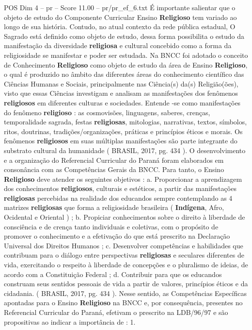 \begin{textsample}{POS Dim 4 – pr – Score 11.00 – pr/pr\_ef\_6.txt}
É importante salientar que o objeto de estudo do Componente Curricular Ensino \textbf{Religioso} tem variado ao longo de sua história.
Contudo, no atual contexto da rede pública estadual, O Sagrado está definido como objeto de estudo, dessa forma possibilita o estudo da manifestação da diversidade \textbf{religiosa} e cultural concebido como a forma da religiosidade se manifestar e poder ser estudada.
Na BNCC foi adotado o conceito de Conhecimento \textbf{Religioso} como objeto de estudo da área de Ensino \textbf{Religioso}, o qual é produzido no âmbito das diferentes áreas do conhecimento científico das Ciências Humanas e Sociais, principalmente nas Ciência(s) da(s) Religião(ões), visto que essas Ciências investigam e analisam as manifestações dos fenômenos \textbf{religiosos} em diferentes culturas e sociedades.
Entende -se como manifestações do fenômeno \textbf{religioso} : as cosmovisões, linguagens, saberes, crenças, temporalidade sagrada, festas \textbf{religiosas}, mitologias, narrativas, textos, símbolos, ritos, doutrinas, tradições/organizações, práticas e princípios éticos e morais.
Os fenômenos \textbf{religiosos} em suas múltiplas manifestações são parte integrante do substrato cultural da humanidade ( BRASIL, 2017, pg. 434 ).
O desenvolvimento e a organização do Referencial Curricular do Paraná foram elaborados em consonância com as Competências Gerais da BNCC.
Para tanto, o Ensino \textbf{Religioso} deve atender os seguintes objetivos : a.
Proporcionar a aprendizagem dos conhecimentos \textbf{religiosos}, culturais e estéticos, a partir das manifestações \textbf{religiosas} percebidas na realidade dos educandos sempre contemplando as 4 matrizes \textbf{religiosas} que forma a religiosidade brasileira ( \textbf{Indígena}, Afro, Ocidental e Oriental ) ; b.
Propiciar conhecimentos sobre o direito à liberdade de consciência e de crença tanto individuais e coletivas, com o propósito de promover o conhecimento e a efetivação do que está prescrito na Declaração Universal dos Direitos Humanos ; c.
Desenvolver competências e habilidades que contribuam para o diálogo entre perspectivas \textbf{religiosas} e seculares diferentes de vida, exercitando o respeito à liberdade de concepções e o pluralismo de ideias, de acordo com a Constituição Federal ; d.
Contribuir para que os educandos construam seus sentidos pessoais de vida a partir de valores, princípios éticos e da cidadania. ( BRASIL, 2017, pg. 434 ).
Nesse sentido, as Competências Específicas apontadas para o Ensino \textbf{Religioso} na BNCC e, por consequência, presentes no Referencial Curricular do Paraná, efetivam o prescrito na LDB/96/97 e são propositivas ao indicar a importância de : 1.

\end{textsample}
